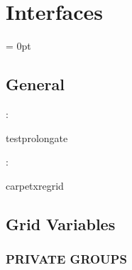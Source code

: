 
\section{Interfaces} 


\parskip = 0pt

\vspace{3mm} \subsection*{General}

: 

testprolongate
\vspace{2mm}

: 

carpetxregrid
\vspace{2mm}
\subsection*{Grid Variables}
\vspace{5mm}\subsubsection{PRIVATE GROUPS}

\vspace{5mm}

